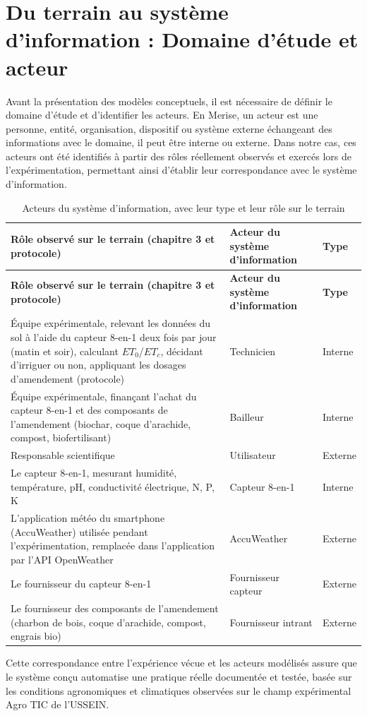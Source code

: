\section{Du terrain au système d’information : Domaine d'étude et acteur}
Avant la présentation des modèles conceptuels, il est nécessaire de définir le domaine d'étude et d'identifier les acteurs. En Merise, un acteur est une personne, entité, organisation, dispositif ou système externe échangeant des informations avec le domaine, il peut être interne ou externe. Dans notre cas, ces acteurs ont été identifiés à partir des rôles réellement observés et exercés lors de l'expérimentation, permettant ainsi d'établir leur correspondance avec le système d’information.

\begin{longtable}{|p{7cm}|p{3.8cm}|p{2.2cm}|}
    \caption{Acteurs du système d'information, avec leur type et leur rôle sur le terrain}
    \label{tab:acteurs_si} \\
    \hline
    \textbf{Rôle observé sur le terrain (chapitre 3 et protocole)} & \textbf{Acteur du système d'information} & \textbf{Type} \\
    \hline
    \endfirsthead
    \hline
    \textbf{Rôle observé sur le terrain (chapitre 3 et protocole)} & \textbf{Acteur du système d'information} & \textbf{Type} \\
    \hline
    \endhead
    Équipe expérimentale, relevant les données du sol à l'aide du capteur 8-en-1 deux fois par jour (matin et soir), calculant $ET_0$/$ET_c$, décidant d'irriguer ou non, appliquant les dosages d'amendement (protocole) & Technicien & Interne \\
    \hline
    Équipe expérimentale, finançant l'achat du capteur 8-en-1 et des composants de l'amendement (biochar, coque d'arachide, compost, biofertilisant) & Bailleur & Interne \\
    \hline
    Responsable scientifique & Utilisateur & Externe \\
    \hline
    Le capteur 8-en-1, mesurant humidité, température, pH, conductivité électrique, N, P, K & Capteur 8-en-1 & Interne \\
    \hline
    L'application météo du smartphone (AccuWeather) utilisée pendant l'expérimentation, remplacée dans l'application par l'API OpenWeather & AccuWeather & Externe \\
    \hline
    Le fournisseur du capteur 8-en-1 & Fournisseur capteur & Externe \\
    \hline
    Le fournisseur des composants de l'amendement (charbon de bois, coque d'arachide, compost, engrais bio) & Fournisseur intrant & Externe \\
    \hline
\end{longtable}

Cette correspondance entre l'expérience vécue et les acteurs modélisés assure que le système conçu automatise une pratique réelle documentée et testée, basée sur les conditions agronomiques et climatiques observées sur le champ expérimental Agro TIC de l'USSEIN.

